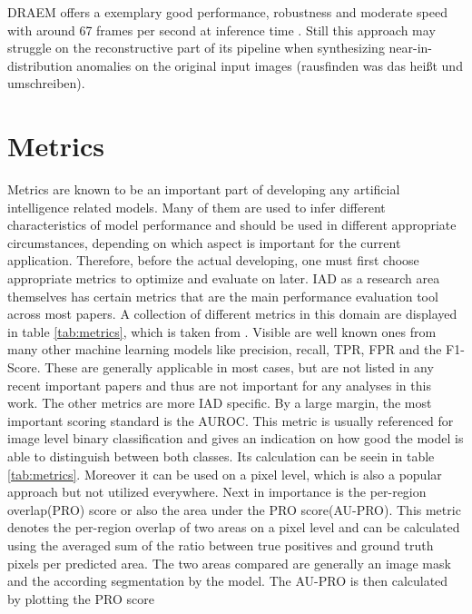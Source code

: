 DRAEM offers a exemplary good performance, robustness and moderate speed with around 67 frames per second at inference time \cite{liu2023simplenet}. Still this approach may struggle on the reconstructive 
part of its pipeline when synthesizing near-in-distribution anomalies on the original input images \cite{liu2024deep} (rausfinden was das heißt und umschreiben).












\section{Metrics}
\label{sec:metrics}
Metrics are known to be an important part of developing any artificial intelligence related models. Many of them are used to infer 
different characteristics of model performance and should be used in different appropriate circumstances, depending on which aspect 
is important for the current application. Therefore, before the actual developing, one must first choose appropriate metrics 
to optimize and evaluate on later. IAD as a research area themselves has certain metrics that are the main performance evaluation tool 
across most papers. 
A collection of different metrics in this domain are displayed in table \ref{tab:metrics}, which is taken from 
\cite{liu2024deep}. Visible are well known 
ones from many other machine learning models like precision, recall, TPR, FPR and the F1-Score. These are generally applicable in most 
cases, but are not listed in any recent important papers and thus are not important for any analyses in this work. The other metrics are 
more IAD specific. By a large margin, the most important scoring standard is the AUROC. This metric is usually referenced for image level 
binary classification and gives an indication on how good the model is able to distinguish between both classes. Its calculation can be seein in 
table \ref{tab:metrics}. Moreover it can be used on a pixel level, which is also a popular approach but not utilized everywhere.
Next in importance is the per-region overlap(PRO) score or also the area under the PRO score(AU-PRO). This metric denotes the per-region overlap of two areas 
on a pixel level and can be calculated using the averaged sum of the ratio between true positives and ground truth pixels per predicted area. The two areas 
compared are generally an image mask and the according segmentation by the model. The AU-PRO is then calculated by plotting the PRO score 
